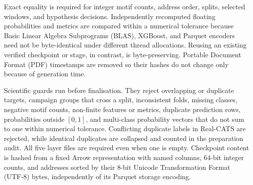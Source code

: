 Exact equality is required for integer motif counts, address order, splits,
selected windows, and hypothesis decisions. Independently recomputed floating
probabilities and metrics are compared within a numerical tolerance because
Basic Linear Algebra Subprograms (BLAS), XGBoost, and Parquet encoders need not be byte-identical under different
thread allocations. Reusing an existing verified checkpoint or stage, in
contrast, is byte-preserving. Portable Document Format (PDF) timestamps are
removed so their hashes do not
change only because of generation time.

Scientific guards run before finalisation. They reject overlapping or duplicate
targets, campaign groups that cross a split, inconsistent folds, missing
classes, negative motif counts, non-finite features or metrics, duplicate
prediction rows, probabilities outside $[0,1]$, and multi-class probability
vectors that do not sum to one within numerical tolerance. Conflicting
duplicate labels in Real-CATS are rejected, while identical duplicates are
collapsed and counted in the preparation audit. All five layer files are
required even when one is empty. Checkpoint content is hashed from a fixed
Arrow representation with named columns, 64-bit integer counts, and addresses
sorted by their 8-bit Unicode Transformation Format (UTF-8) bytes,
independently of its Parquet storage encoding.

